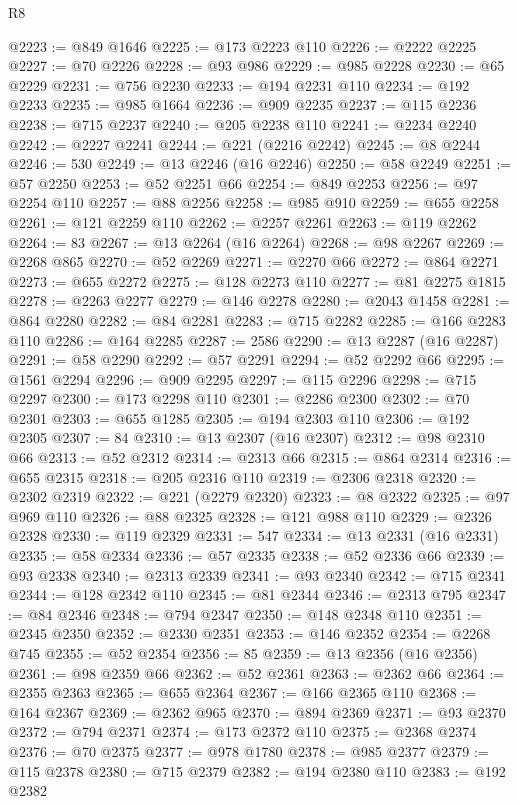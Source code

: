 \begin{lexlean}{R8}
\begin{coremodule}
@2223 := @849 @1646
@2225 := @173 @2223 @110
@2226 := @2222 @2225
@2227 := @70 @2226
@2228 := @93 @986
@2229 := @985 @2228
@2230 := @65 @2229
@2231 := @756 @2230
@2233 := @194 @2231 @110
@2234 := @192 @2233
@2235 := @985 @1664
@2236 := @909 @2235
@2237 := @115 @2236
@2238 := @715 @2237
@2240 := @205 @2238 @110
@2241 := @2234 @2240
@2242 := @2227 @2241
@2244 := @221 (@2216 @2242)
@2245 := @8 @2244
@2246 := 530
@2249 := @13 @2246 (@16 @2246)
@2250 := @58 @2249
@2251 := @57 @2250
@2253 := @52 @2251 @66
@2254 := @849 @2253
@2256 := @97 @2254 @110
@2257 := @88 @2256
@2258 := @985 @910
@2259 := @655 @2258
@2261 := @121 @2259 @110
@2262 := @2257 @2261
@2263 := @119 @2262
@2264 := 83
@2267 := @13 @2264 (@16 @2264)
@2268 := @98 @2267
@2269 := @2268 @865
@2270 := @52 @2269
@2271 := @2270 @66
@2272 := @864 @2271
@2273 := @655 @2272
@2275 := @128 @2273 @110
@2277 := @81 @2275 @1815
@2278 := @2263 @2277
@2279 := @146 @2278
@2280 := @2043 @1458
@2281 := @864 @2280
@2282 := @84 @2281
@2283 := @715 @2282
@2285 := @166 @2283 @110
@2286 := @164 @2285
@2287 := 2586
@2290 := @13 @2287 (@16 @2287)
@2291 := @58 @2290
@2292 := @57 @2291
@2294 := @52 @2292 @66
@2295 := @1561 @2294
@2296 := @909 @2295
@2297 := @115 @2296
@2298 := @715 @2297
@2300 := @173 @2298 @110
@2301 := @2286 @2300
@2302 := @70 @2301
@2303 := @655 @1285
@2305 := @194 @2303 @110
@2306 := @192 @2305
@2307 := 84
@2310 := @13 @2307 (@16 @2307)
@2312 := @98 @2310 @66
@2313 := @52 @2312
@2314 := @2313 @66
@2315 := @864 @2314
@2316 := @655 @2315
@2318 := @205 @2316 @110
@2319 := @2306 @2318
@2320 := @2302 @2319
@2322 := @221 (@2279 @2320)
@2323 := @8 @2322
@2325 := @97 @969 @110
@2326 := @88 @2325
@2328 := @121 @988 @110
@2329 := @2326 @2328
@2330 := @119 @2329
@2331 := 547
@2334 := @13 @2331 (@16 @2331)
@2335 := @58 @2334
@2336 := @57 @2335
@2338 := @52 @2336 @66
@2339 := @93 @2338
@2340 := @2313 @2339
@2341 := @93 @2340
@2342 := @715 @2341
@2344 := @128 @2342 @110
@2345 := @81 @2344
@2346 := @2313 @795
@2347 := @84 @2346
@2348 := @794 @2347
@2350 := @148 @2348 @110
@2351 := @2345 @2350
@2352 := @2330 @2351
@2353 := @146 @2352
@2354 := @2268 @745
@2355 := @52 @2354
@2356 := 85
@2359 := @13 @2356 (@16 @2356)
@2361 := @98 @2359 @66
@2362 := @52 @2361
@2363 := @2362 @66
@2364 := @2355 @2363
@2365 := @655 @2364
@2367 := @166 @2365 @110
@2368 := @164 @2367
@2369 := @2362 @965
@2370 := @894 @2369
@2371 := @93 @2370
@2372 := @794 @2371
@2374 := @173 @2372 @110
@2375 := @2368 @2374
@2376 := @70 @2375
@2377 := @978 @1780
@2378 := @985 @2377
@2379 := @115 @2378
@2380 := @715 @2379
@2382 := @194 @2380 @110
@2383 := @192 @2382

\end{coremodule}
\end{lexlean}
